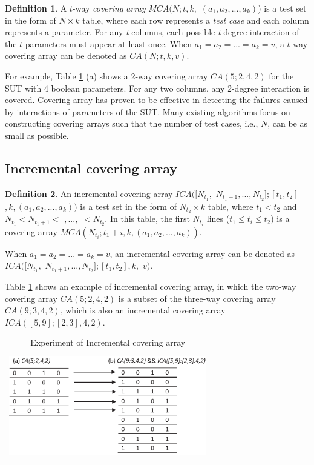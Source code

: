 \documentclass[conference]{IEEEtran}
\theoremstyle{definition}
\newtheorem{definition}{Definition}
\begin{document}
\begin{definition}A $t$-way \emph{covering array} $MCA(N; t, k,$ $(a_{1}, a_{2}, ..., a_{k})$) is a test set in the form of $N \times k$ table, where each row represents a \emph{test case} and each column represents a parameter.  For any \emph{t} columns, each possible \emph{t}-degree interaction of the $t$ parameters must appear at least once. When $ a_{1} = a_{2} = ... = a_{k} = v $, a $t$-way covering array can be denoted as $CA(N; t, k, v)$.
\end{definition}


For example, Table \ref{ica_example} (a) shows a 2-way covering array $CA(5;2,4,2)$ for the SUT with 4 boolean parameters. For any two columns, any 2-degree interaction is covered.  Covering array has proven to be effective in detecting the failures caused by interactions of parameters of the SUT. Many existing algorithms focus on constructing covering arrays such that the number of test cases, i.e., $N$, can be as small as possible.


\subsection{Incremental covering array}

\begin{definition}
An incremental covering array $ICA([N_{t_{1}},$ $N_{t_{1} + 1},...,N_{t_{2}}];[t_{1},t_{2}]$ $, k, (a_{1},a_{2},...,a_{k}))$ is a test set in the form of $N_{t_{2}} \times k$ table, where $t_{1} < t_{2}$ and  $N_{t_{1}}<N_{t_{1} + 1} <$ $,...,$ $< N_{t_{2}}$.  In this table, the first $N_{t_{i}}$ lines ($t_{1}\leq t_{i} \leq t_{2}$) is a covering array $MCA(N_{t_{i}}; t_{1} + i, k , (a_{1},a_{2},...,a_{k}))$.

 When $ a_{1} = a_{2} = ... = a_{k} = v $, an incremental covering array can be denoted as $ICA([N_{t_{1}},$ $N_{t_{1} + 1},...,N_{t_{2}}];[t_{1},t_{2}], k,$ $ v)$.
\end{definition}


Table \ref{ica_example} shows an example of incremental covering array, in which the two-way covering array $CA(5;2,4,2)$ is a subset of the three-way covering array $CA(9;3,4,2)$, which is also an incremental covering array $ICA([5,9];[2,3],4,2)$.

\begin{table}[htbp]
  \small
  \centering
  \caption{Experiment of Incremental covering array}
  \label{ica_example}

    \begin{tabular}{c}
 \includegraphics[width=3.4in]{incremental_covering_ex.eps}
    \end{tabular}%

\end{table}
\end{document}
